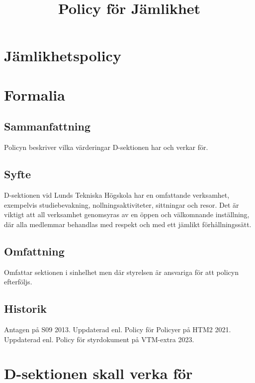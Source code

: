 \documentclass{dsekprotokoll}
\title{Policy för Jämlikhet}
\author{}
\begin{document}
\section*{Jämlikhetspolicy}
\section{Formalia}
\subsection{Sammanfattning}
Policyn beskriver vilka värderingar D-sektionen har och verkar för.
\subsection{Syfte}
D-sektionen vid Lunds Tekniska Högskola har en omfattande verksamhet, exempelvis studiebevakning, nollningsaktiviteter, sittningar och resor. Det är viktigt att all verksamhet
genomsyras av en öppen och välkomnande inställning, där alla medlemmar behandlas med
respekt och med ett jämlikt förhållningssätt.
\subsection{Omfattning}
Omfattar sektionen i sinhelhet men där styrelsen är ansvariga för att policyn efterföljs.
\subsection{Historik}
Antagen på S09 2013.
Uppdaterad enl. Policy för Policyer på HTM2 2021. Uppdaterad enl. Policy för styrdokument på VTM-extra 2023.


\section{D-sektionen skall verka för}
\end{document}
